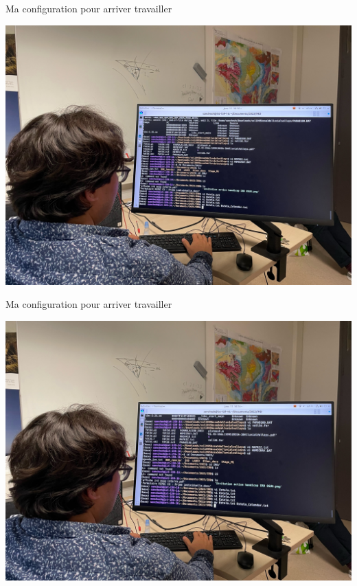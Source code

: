 \documentclass{beamer}
\begin{document}
\begin{frame}
 {Ma configuration pour arriver travailler}
 
  \includegraphics[width=1\linewidth]{images/photos/5/image2.jpeg}  
 
\end{frame}

\begin{frame}
 {Ma configuration pour arriver travailler}
 
  \includegraphics[width=1\linewidth]{images/photos/5/image1.jpeg}  
 
\end{frame}
\end{document}
